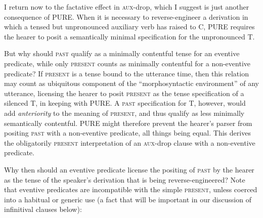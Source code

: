 \documentclass[output=paper]{langscibook}
\begin{document}
I return now to the factative effect in \textsc{aux-}drop, which I suggest is just another consequence of PURE. When it is necessary to reverse-engineer a derivation in which a tensed but unpronounced auxiliary verb has raised to C, PURE requires the hearer to posit a semantically minimal specification for the unpronounced T.\largerpage

But why should \textsc{past} qualify as a minimally contentful tense for an eventive predicate, while only \textsc{present} counts as minimally contentful for a non-eventive predicate? If \textsc{present} is a tense bound to the utterance time, then this relation may count as ubiquitous component of the “morphosyntactic environment” of any utterance, licensing the hearer to posit \textsc{present} as the tense specification of a silenced T, in keeping with PURE. A \textsc{past} specification for T, however, would add\textit{ anteriority} to the meaning of \textsc{present}, and thus qualify as less minimally semantically contentful. PURE might therefore prevent the hearer's parser from positing \textsc{past} with a non-eventive predicate, all things being equal. This derives the obligatorily \textsc{present} interpretation of an \textsc{aux-}drop clause with a non-eventive predicate.

Why then should an eventive predicate license the positing of \textsc{past} by the hearer as the tense of the speaker's derivation that is being reverse-engineered? Note that eventive predicates are incompatible with the simple\textsc{ present}, unless coerced into a habitual or generic use (a fact that will be important in our discussion of infinitival clauses below):\largerpage[1]
\end{document}
